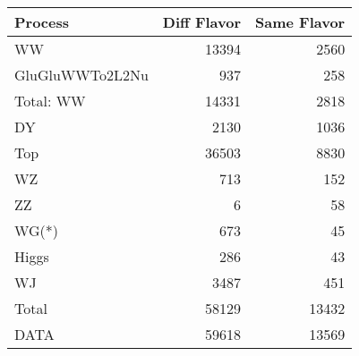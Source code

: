 \begin{table}[ht]
	\centering
\begin{tabular}{lrr}

         Process &  Diff Flavor &  Same Flavor \\
		\hline
              WW &        13394 &         2560 \\
 GluGluWWTo2L2Nu &          937 &          258 \\
\hline
       Total: WW &        14331 &         2818 \\
              DY &         2130 &         1036 \\
             Top &        36503 &         8830 \\
              WZ &          713 &          152 \\
              ZZ &            6 &           58 \\
           WG(*) &          673 &           45 \\
           Higgs &          286 &           43 \\
              WJ &         3487 &          451 \\
\hline
           Total &        58129 &        13432 \\
            DATA &        59618 &        13569 \\


\end{tabular}

\end{table}
